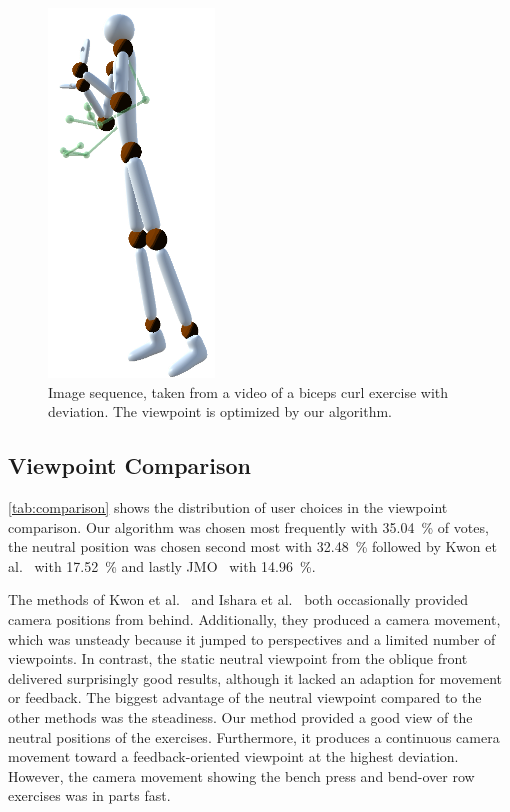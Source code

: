 \begin{figure}[t!]
	\includegraphics[width=0.11\linewidth]{pictures/bicepsSequence8.png}\hfill
	\caption{Image sequence, taken from a video of a biceps curl exercise with deviation. The viewpoint is optimized by our algorithm.}
	\label{fig:bicepsSequence}
\end{figure}

\subsection{Viewpoint Comparison \label{sec:results:comparison}}
\autoref{tab:comparison} shows the distribution of user choices in the viewpoint comparison. Our algorithm was chosen most frequently with 35.04~\% of votes, the neutral position was chosen second most with 32.48~\% followed by Kwon et al.~\cite{kwon2020ocp} with 17.52~\% and lastly JMO~\cite{ishara2015mra} with 14.96~\%.

The methods of Kwon et al.~\cite{kwon2020ocp} and Ishara et al.~\cite{ishara2015mra} both occasionally provided camera positions from behind. Additionally, they produced a camera movement, which was unsteady because it jumped to perspectives and a limited number of viewpoints. In contrast, the static neutral viewpoint from the oblique front delivered surprisingly good results, although it lacked an adaption for movement or feedback. The biggest advantage of the neutral viewpoint compared to the other methods was the steadiness. Our method provided a good view of the neutral positions of the exercises. Furthermore, it produces a continuous camera movement toward a feedback-oriented viewpoint at the highest deviation. However, the camera movement showing the bench press and bend-over row exercises was in parts fast.

